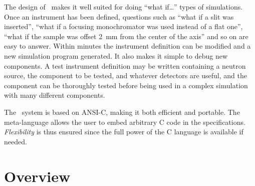 The design of \MCS\ makes it well suited for doing ``what if\ldots''
types of simulations. Once an instrument has been defined, questions
such as ``what if a slit was inserted'', ``what if a focusing
monochromator was used instead of a flat one'', ``what if the sample was
offset 2~mm from the center of the axis'' and so on are easy to answer. Within
minutes the instrument definition can be modified and a
new simulation program generated. It also makes it simple to debug new
components. A test instrument definition may be written
containing a neutron source, the component to be tested, and whatever
detectors are useful, and the component can be thoroughly tested before
being used in a complex simulation with many different components.

The \MCS\ system is based on ANSI-C, making it both efficient and
portable. The meta-language allows the user to embed arbitrary C code in
the specifications. \textit{Flexibility} is thus ensured since the full
power of the C language is available if needed.


\section{Overview}


